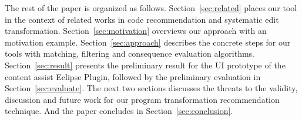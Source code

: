 The rest of the paper is organized as follows. Section~\ref{sec:related} places our tool in the context of related works in code recommendation and systematic edit transformation. Section~\ref{sec:motivation} overviews our approach with an motivation example. Section~\ref{sec:approach} describes the concrete steps for our tools with matching, filtering and consequence evaluation algorithms. Section~\ref{sec:result} presents the preliminary result for the UI prototype of the content assist Eclipse Plugin, followed by the preliminary evaluation in Section~\ref{sec:evaluate}. The next two sections discusses the threats to the validity, discussion and future work for our program transformation recommendation technique. And the paper concludes in Section~\ref{sec:conclusion}.











